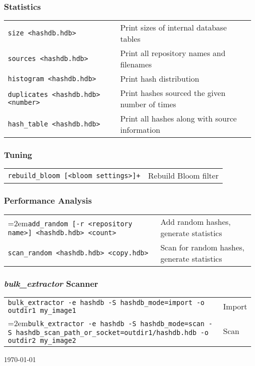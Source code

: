 \documentclass[12pt]{article}
\newcommand{\bulk}{\emph{bulk\_extractor}\xspace}
\begin{document}
\subsubsection*{Statistics}
\begin{tabular}{p{8 cm} p{9 cm} }
\texttt{size <hashdb.hdb>} & Print sizes of internal database tables \\
\texttt{sources <hashdb.hdb>} & Print all repository names and filenames \\
\texttt{histogram <hashdb.hdb>} & Print hash distribution \\
\texttt{duplicates <hashdb.hdb> <number>} & Print hashes sourced the given number of times \\
\texttt{hash\_table <hashdb.hdb>} & Print all hashes along with source information\\
\end{tabular}

\subsubsection*{Tuning}
\begin{tabular}{p{8 cm} p{9 cm} }
\texttt{rebuild\_bloom [<bloom settings>]+} & Rebuild Bloom filter \\
\end{tabular}

\subsubsection*{Performance Analysis}
\begin{tabular}{p{8 cm} p{9 cm} }
\hangindent=2em\texttt{add\_random [-r <repository name>] <hashdb.hdb> <count>} & Add random hashes, generate statistics \\
\texttt{scan\_random <hashdb.hdb> <copy.hdb>} & Scan for random hashes, generate statistics \\
\end{tabular}

\subsubsection*{\bulk Scanner}
\begin{tabular}{p{15 cm} p{4 cm} }
\texttt{bulk\_extractor -e hashdb -S hashdb\_mode=import -o outdir1 my\_image1} & Import \\
\hangindent=2em\texttt{bulk\_extractor -e hashdb -S hashdb\_mode=scan -S hashdb\_scan\_path\_or\_socket=outdir1/hashdb.hdb -o outdir2 my\_image2} & Scan \\
\end{tabular}

\vspace{2mm}
\begin{center}
\begin{footnotesize}
\today
\end{footnotesize}
\end{center}
\end{document}
